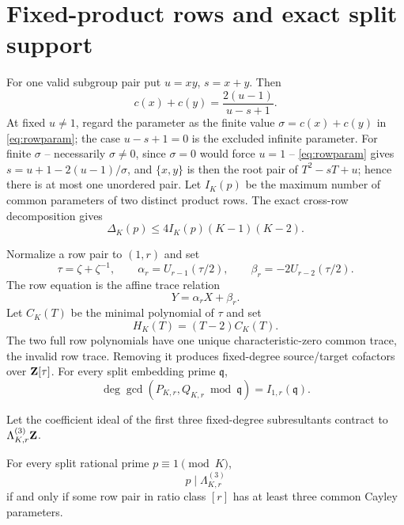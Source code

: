 \section{Fixed-product rows and exact split support}

For one valid subgroup pair put $u=xy$, $s=x+y$.  Then
\begin{equation}\label{eq:rowparam}
c(x)+c(y)=\frac{2(u-1)}{u-s+1}.
\end{equation}
At fixed $u\ne1$, regard the parameter as the finite value
$\sigma=c(x)+c(y)$ in \eqref{eq:rowparam}; the case $u-s+1=0$ is the
excluded infinite parameter.  For finite $\sigma$ -- necessarily
$\sigma\ne0$, since $\sigma=0$ would force $u=1$ -- \eqref{eq:rowparam}
gives $s=u+1-2(u-1)/\sigma$, and $\{x,y\}$ is then the root pair of
$T^2-sT+u$; hence there is at most one unordered pair.
Let $I_K(p)$ be the maximum number of common parameters of two distinct product
rows.  The exact cross-row decomposition gives
\begin{equation}\label{eq:rowenergy}
\Delta_K(p)\le4I_K(p)(K-1)(K-2).
\end{equation}

Normalize a row pair to $(1,r)$ and set
\[
\tau=\zeta+\zeta^{-1},\qquad
\alpha_r=U_{r-1}(\tau/2),\qquad
\beta_r=-2U_{r-2}(\tau/2).
\]
The row equation is the affine trace relation
\begin{equation}\label{eq:affinetrace}
Y=\alpha_rX+\beta_r.
\end{equation}
Let $C_K(T)$ be the minimal polynomial of $\tau$ and set
\[
H_K(T)=(T-2)C_K(T).
\]
The two full row polynomials have one unique characteristic-zero common trace,
the invalid row trace.  Removing it produces fixed-degree source/target
cofactors over $\mathbf Z[\tau]$.  For every split embedding prime $\mathfrak q$,
\begin{equation}\label{eq:gcdcount}
\deg\gcd(P_{K,r},Q_{K,r}\bmod\mathfrak q)
 =I_{1,r}(\mathfrak q).
\end{equation}

Let the coefficient ideal of the first three fixed-degree subresultants
contract to $\Lambda_{K,r}^{(3)}\mathbf Z$.

\begin{theorem}\label{thm:lambda}
For every split rational prime $p\equiv1\pmod K$,
\[
p\mid\Lambda_{K,r}^{(3)}
\]
if and only if some row pair in ratio class $[r]$ has at least three common
Cayley parameters.
\end{theorem}

